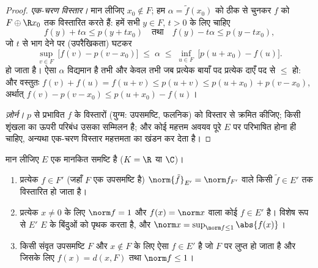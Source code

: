 \begin{proof}
\emph{एक-चरण विस्तार।} मान लीजिए $x_0 \notin F$; हम $\alpha = \tilde f(x_0)$ को ठीक से चुनकर
$f$ को $F \oplus \R x_0$ तक विस्तारित करते हैं: हमें सभी $y \in F$, $t > 0$ के
लिए चाहिए
\[
f(y) + t\alpha \leq p(y + tx_0)
\quad\text{तथा}\quad
f(y) - t\alpha \leq p(y - tx_0),
\]
जो $t$ से भाग देने पर (उपरैखिकता) घटकर
\[
\sup_{v \in F}\ \bigl[f(v) - p(v - x_0)\bigr]
\;\leq\; \alpha \;\leq\;
\inf_{u \in F}\ \bigl[p(u + x_0) - f(u)\bigr].
\]
हो जाता है। ऐसा $\alpha$ विद्यमान है तभी और केवल तभी जब प्रत्येक
बायाँ पद प्रत्येक दाएँ पद से $\leq$ हो: और वस्तुतः $f(v) + f(u) = f(u + v) \leq p(u + v) \leq
p(u + x_0) + p(v - x_0)$, अर्थात्
$f(v) - p(v - x_0) \leq p(u +
x_0) - f(u)$।

\emph{ज़ोर्न।} $p$ से प्रभावित $f$ के विस्तारों (युग्म:
उपसमष्टि, फलनिक) को विस्तार से क्रमित कीजिए; किसी शृंखला का ऊपरी
परिबंध उसका सम्मिलन है; और कोई महत्तम अवयव पूरे $E$ पर
परिभाषित होना ही चाहिए, अन्यथा एक-चरण विस्तार महत्तमता का खंडन कर
देता है।
\end{proof}

\begin{corollary}\label{cor:b3:banach:hbnormed}
मान लीजिए $E$ एक मानकित समष्टि है ($K = \R$ या $\C$)।
\begin{enumerate}
  \item प्रत्येक $f \in F'$ (जहाँ $F$ एक उपसमष्टि है) $\norm{\tilde f}_{E'} = \norm f_{F'}$ वाले
        किसी $\tilde f
        \in E'$ तक विस्तारित हो जाता है।
  \item प्रत्येक $x \neq 0$ के लिए $\norm f
        = 1$ और $f(x) = \norm x$ वाला कोई $f \in E'$ है।
        विशेष रूप से $E'$ $E$ के बिंदुओं को पृथक करता है, और
        $\norm x = \sup_{\norm f \leq
        1}\abs{f(x)}$।
  \item किसी संवृत उपसमष्टि $F$ और $x \notin F$ के लिए ऐसा $f
        \in E'$ है
        जो $F$ पर लुप्त हो जाता है और जिसके लिए $f(x) = d(x, F)$ तथा
        $\norm f \leq 1$।
\end{enumerate}
\end{corollary}

